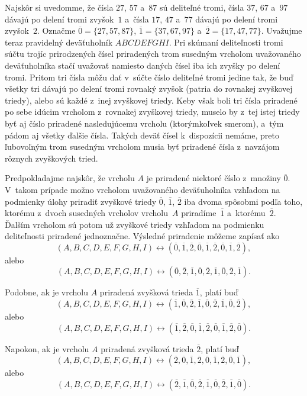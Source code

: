 {%
Najskôr si uvedomme, že čísla $27$, $57$ a~$87$ sú
deliteľné tromi, čísla $37$, $67$ a~$97$ dávajú po delení tromi zvyšok~$1$
a~čísla $17$, $47$ a~$77$ dávajú po delení tromi zvyšok~$2$. Označme
$\overline{0}=\{27,57,87\}$, $\overline{1}=\{37,67,97\}$
a~$\overline{2}=\{17,47,77\}$. Uvažujme teraz pravidelný deväťuholník
$ABCDEFGHI$. Pri skúmaní deliteľnosti tromi súčtu trojíc
prirodzených čísel priradených trom susedným vrcholom uvažovaného
deväťuholníka stačí uvažovať namiesto daných čísel iba ich zvyšky po
delení tromi. Pritom tri čísla môžu dať v~súčte číslo deliteľné tromi
jedine tak, že buď všetky tri dávajú po delení tromi rovnaký zvyšok
(patria do rovnakej zvyškovej triedy),
alebo sú každé z~inej zvyškovej triedy. Keby však boli tri čísla priradené
po sebe idúcim vrcholom z~rovnakej zvyškovej triedy, muselo by z~tej istej triedy
byť aj číslo priradené nasledujúcemu vrcholu (ktorýmkoľvek smerom), a~tým pádom
aj všetky ďalšie čísla. Takých deväť čísel k~dispozícii nemáme,
preto ľubovoľným trom susedným vrcholom musia
byť priradené čísla z~navzájom rôznych zvyškových tried.

Predpokladajme najskôr, že vrcholu $A$ je
priradené niektoré číslo z~množiny $\overline{0}$.
V~takom prípade možno vrcholom uvažovaného deväťuholníka vzhľadom na
podmienky úlohy priradiť zvyškové triedy $\overline{0}$, $\overline{1}$,
$\overline{2}$ iba dvoma spôsobmi podľa toho, ktorému z~dvoch susedných
vrcholov vrcholu~$A$ priradíme~$\overline{1}$ a~ktorému~$\overline{2}$.
Ďalším vrcholom sú potom už zvyškové triedy vzhľadom na podmienku deliteľnosti
priradené jednoznačne. Výsledné priradenie môžeme zapísať ako
$$
(A,B,C,D,E,F,G,H,I)\leftrightarrow
(\overline{0},\overline{1},\overline{2},\overline{0},\overline{1},\overline{2},
\overline{0},\overline{1},\overline{2}),
$$
alebo
$$
(A,B,C,D,E,F,G,H,I)\leftrightarrow
(\overline{0},\overline{2},\overline{1},\overline{0},\overline{2},\overline{1},
\overline{0},\overline{2},\overline{1}).
$$

Podobne, ak je vrcholu $A$ priradená zvyšková trieda $\overline{1}$,
platí buď
$$
(A,B,C,D,E,F,G,H,I)\leftrightarrow
(\overline{1},\overline{0},\overline{2},\overline{1},\overline{0},
\overline{2},\overline{1},\overline{0},\overline{2}),
$$
alebo
$$
(A,B,C,D,E,F,G,H,I)\leftrightarrow
(\overline{1},\overline{2},\overline{0},\overline{1},\overline{2},
\overline{0},\overline{1},\overline{2},\overline{0}).
$$

Napokon, ak je vrcholu $A$ priradená zvyšková trieda $\overline{2}$,
platí buď
$$
(A,B,C,D,E,F,G,H,I)\leftrightarrow
(\overline{2},\overline{0},\overline{1},\overline{2},\overline{0},
\overline{1},\overline{2},\overline{0},\overline{1}),
$$
alebo
$$
(A,B,C,D,E,F,G,H,I)\leftrightarrow
(\overline{2},\overline{1},\overline{0},\overline{2},\overline{1},
\overline{0},\overline{2},\overline{1},\overline{0}).
$$

}
